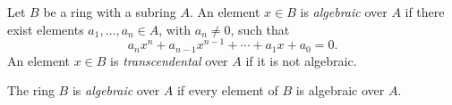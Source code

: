 \documentclass[12pt]{article}
\begin{document}
Let $B$ be a ring with a subring $A$. An element $x \in B$ is {\em algebraic} over $A$ if there exist elements $a_1, \dots, a_n \in A$, with $a_n \neq 0$, such that
$$
a_n x^n + a_{n-1} x^{n-1} + \cdots + a_1 x + a_0 = 0.
$$
An element $x \in B$ is {\em transcendental} over $A$ if it is not algebraic.

The ring $B$ is {\em algebraic} over $A$ if every element of $B$ is algebraic over $A$.
\end{document}
